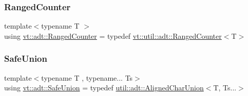 \mbox{\label{namespacevt_1_1adt_a075b41b03183cb280d453f44d5397637}} 
\subsubsection{\texorpdfstring{Ranged\+Counter}{RangedCounter}}
{\footnotesize\ttfamily template$<$typename T $>$ \\
using \hyperlink{namespacevt_1_1adt_a075b41b03183cb280d453f44d5397637}{vt\+::adt\+::\+Ranged\+Counter} = typedef \hyperlink{structvt_1_1util_1_1adt_1_1_ranged_counter}{vt\+::util\+::adt\+::\+Ranged\+Counter}$<$T$>$}

\mbox{\label{namespacevt_1_1adt_ad2a7bbcb5f4735ae9d847f96ee62f144}} 
\subsubsection{\texorpdfstring{Safe\+Union}{SafeUnion}}
{\footnotesize\ttfamily template$<$typename T , typename... Ts$>$ \\
using \hyperlink{namespacevt_1_1adt_ad2a7bbcb5f4735ae9d847f96ee62f144}{vt\+::adt\+::\+Safe\+Union} = typedef \hyperlink{structvt_1_1util_1_1adt_1_1_aligned_char_union}{util\+::adt\+::\+Aligned\+Char\+Union}$<$T, Ts...$>$}

